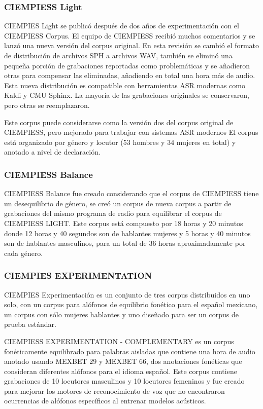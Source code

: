 \subsubsection{CIEMPIESS Light}

CIEMPIES Light \cite{CIEMPIESS-LIGHT} se publicó después de dos años de experimentación con el CIEMPIESS Corpus. El equipo de CIEMPIESS recibió muchos comentarios y se lanzó una nueva versión del corpus original. En esta revisión se cambió el formato de distribución de archivos SPH a archivos WAV, también se eliminó una pequeña porción de grabaciones reportadas como problemáticas y se añadieron otras para compensar las eliminadas, añadiendo en total una hora m\'as de audio. Esta nueva distribución es compatible con herramientas ASR modernas como Kaldi y CMU Sphinx. La mayoría de las grabaciones originales se conservaron, pero otras se reemplazaron. 

Este corpus puede considerarse como la versión dos del corpus original de CIEMPIESS, pero mejorado para trabajar con sistemas ASR modernos El corpus está organizado por género y locutor (53 hombres y 34 mujeres en total) y anotado a nivel de declaración. 

\subsubsection{CIEMPIESS Balance}

CIEMPIESS Balance \cite{CIEMPIESS-BALANCE} fue creado considerando que el corpus de CIEMPIESS tiene un desequilibrio de género, se creó un corpus de nueva corpus a partir de grabaciones del mismo programa de radio para equilibrar el corpus de CIEMPIESS LIGHT. Este corpus está compuesto por 18 horas y 20 minutos donde 12 horas y 40 segundos son de hablantes mujeres y 5 horas y 40 minutos son de hablantes masculinos, para un total de 36 horas aproximadamente por cada género.


\subsubsection{CIEMPIES EXPERIMENTATION}

CIEMPIES Experimentación \cite{CIEMPIESS-Experimentation} es un conjunto de tres corpus distribuidos en uno solo, con un corpus para alófonos de equilibrio fonético para el español mexicano, un corpus con s\'olo mujeres hablantes y uno diseñado para ser un corpus de prueba estándar.

CIEMPIESS EXPERIMENTATION - COMPLEMENTARY es un corpus fonéticamente equilibrado para palabras aisladas que contiene una hora de audio anotado usando MEXBET 29 y MEXBET 66, dos anotaciones fonéticas que consideran diferentes alófonos para el idioma español. Este corpus contiene grabaciones de 10 locutores masculinos y 10 locutores femeninos y fue creado para mejorar los motores de reconocimiento de voz que no encontraron ocurrencias de alófonos específicos al entrenar modelos acústicos.

